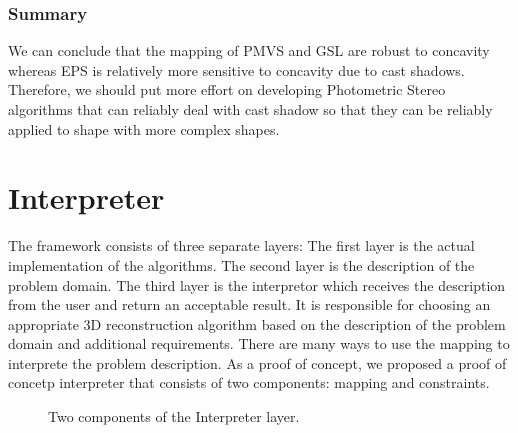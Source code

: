 \subsubsection{Summary}
We can conclude that the mapping of PMVS and GSL are robust to concavity whereas EPS is relatively more sensitive to concavity due to cast shadows. Therefore, we should put more effort on developing Photometric Stereo algorithms that can reliably deal with cast shadow so that they can be reliably applied to shape with more complex shapes.


\section{Interpreter}
The framework consists of three separate layers: The first layer is the actual implementation of the algorithms. The second layer is the description of the problem domain. The third layer is the interpretor which receives the description from the user and return an acceptable result. It is responsible for choosing an appropriate 3D reconstruction algorithm based on the description of the problem domain and additional requirements. There are many ways to use the mapping to interprete the problem description. As a proof of concept, we proposed a proof of concetp interpreter that consists of two components: mapping and constraints.
\begin{figure}[!htbp]
\centering
{}
\caption{Two components of the Interpreter layer.}
\label{fig:interpreter_layer}
\end{figure}

